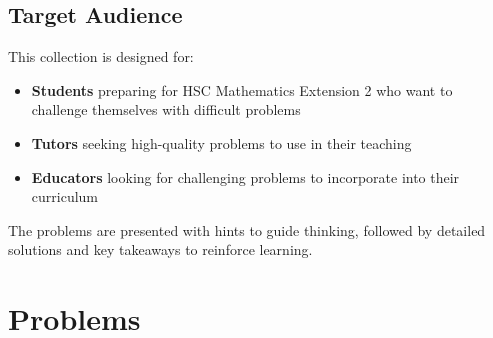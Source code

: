 \documentclass[12pt]{article}
\begin{document}
\subsection{Target Audience}

This collection is designed for:
\begin{itemize}
    \item \textbf{Students} preparing for HSC Mathematics Extension 2 who want to challenge themselves with difficult problems
    \item \textbf{Tutors} seeking high-quality problems to use in their teaching
    \item \textbf{Educators} looking for challenging problems to incorporate into their curriculum
\end{itemize}

The problems are presented with hints to guide thinking, followed by detailed solutions and key takeaways to reinforce learning.


\section{Problems}



































\end{document}
